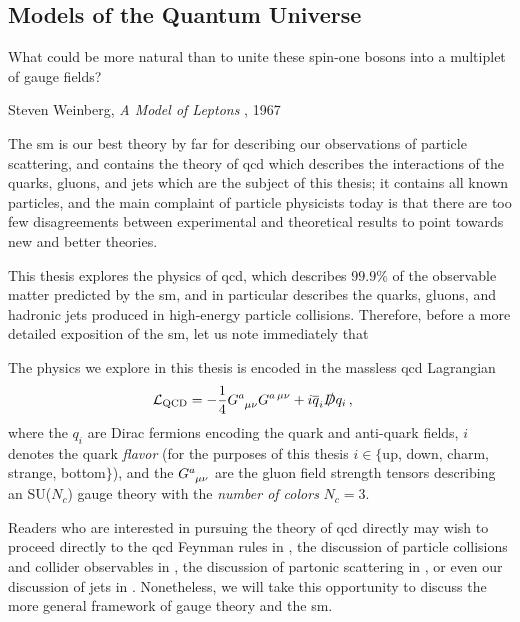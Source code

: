 \subsection{Models of the Quantum Universe}
\label{sec:sm-qcd}

\epigraph{What could be more natural than to unite these spin-one bosons into a multiplet of gauge fields?}{Steven Weinberg, \textit{A Model of Leptons} \cite{Weinberg:1967tq}, 1967}

The \gls{sm} is our best theory by far for describing our observations of particle scattering, and contains the theory of \gls{qcd} which describes the interactions of the quarks, gluons, and jets which are the subject of this thesis;
%
it contains all known particles, and the main complaint of particle physicists today is that there are too few disagreements between experimental and theoretical results to point towards new and better theories.

This thesis explores the physics of \gls{qcd}, which describes \(99.9\%\) of the observable matter predicted by the \gls{sm}, and in particular describes the quarks, gluons, and hadronic jets produced in high-energy particle collisions.
%
Therefore, before a more detailed exposition of the \gls{sm}, let us note immediately that
\begin{answer}
    The physics we explore in this thesis is encoded in the massless \gls{qcd} Lagrangian
    \begin{align}
        \label{eq:qcd-lagrangian}
        \mathcal{L}_\text{QCD}
        &=
        - \frac{1}{4} G\indices{^a_{\mu\nu}} G^{a\,\mu\nu}
        +
        i \overline{q}_i \slashed{D} q_i
        \,,
    \end{align}
    where the \(q_i\) are Dirac fermions encoding the quark and anti-quark fields, \(i\) denotes the quark \textit{flavor} (for the purposes of this thesis \(i \in \{\)up, down, charm, strange, bottom\(\}\)), and the \(G\indices{^a_{\mu\nu}}\) are the gluon field strength tensors describing an SU(\(N_c\)) gauge theory with the \textit{number of colors} \(N_c = 3\).
\end{answer}

Readers who are interested in pursuing the theory of \gls{qcd} directly may wish to proceed directly to the \gls{qcd} Feynman rules in , the discussion of particle collisions and collider observables in , the discussion of partonic scattering in , or even our discussion of jets in .
%
Nonetheless, we will take this opportunity to discuss the more general framework of gauge theory and the \gls{sm}.


